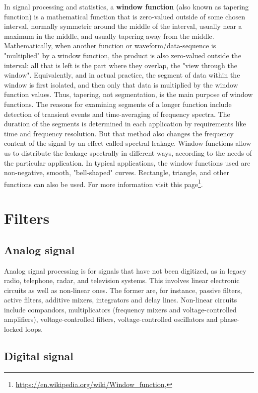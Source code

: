 \documentclass[12pt]{article}
\theoremstyle{plain}
\begin{document}
In signal processing and statistics, a \textbf{window function} (also known as tapering function) is a mathematical function that is zero-valued outside of some chosen interval, normally symmetric around the middle of the interval, usually near a maximum in the middle, and usually tapering away from the middle. Mathematically, when another function or waveform/data-sequence is "multiplied" by a window function, the product is also zero-valued outside the interval: all that is left is the part where they overlap, the "view through the window". Equivalently, and in actual practice, the segment of data within the window is first isolated, and then only that data is multiplied by the window function values. Thus, tapering, not segmentation, is the main purpose of window functions. The reasons for examining segments of a longer function include detection of transient events and time-averaging of frequency spectra. The duration of the segments is determined in each application by requirements like time and frequency resolution. But that method also changes the frequency content of the signal by an effect called spectral leakage. Window functions allow us to distribute the leakage spectrally in different ways, according to the needs of the particular application. In typical applications, the window functions used are non-negative, smooth, "bell-shaped" curves. Rectangle, triangle, and other functions can also be used. For more information visit this page\footnote{\url{https://en.wikipedia.org/wiki/Window_function},}.

\section{Filters}


\subsection{Analog signal}

Analog signal processing is for signals that have not been digitized, as in legacy radio, telephone, radar, and television systems. This involves linear electronic circuits as well as non-linear ones. The former are, for instance, passive filters, active filters, additive mixers, integrators and delay lines. Non-linear circuits include compandors, multiplicators (frequency mixers and voltage-controlled amplifiers), voltage-controlled filters, voltage-controlled oscillators and phase-locked loops.


\subsection{Digital signal}
\end{document}
